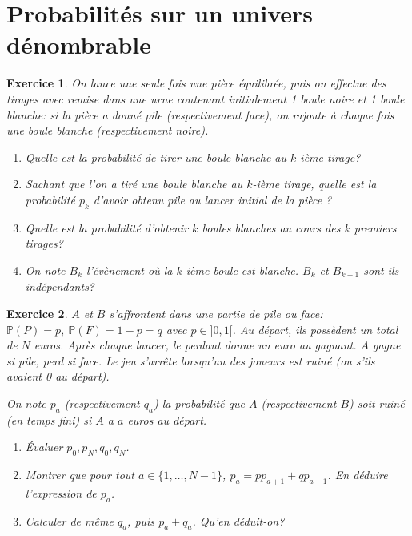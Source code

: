 \documentclass[12pt]{article}
\newtheorem{exercise}{Exercice}[section]
\theoremstyle{remark}
\theoremstyle{remark}
\renewcommand{\P}{\mathbb{P}} \newcommand{\im}{\emph{Im}}
\begin{document}
\cleardoublepage
\section{Probabilités sur un univers dénombrable}

\begin{exercise}
	On lance une seule fois une pièce équilibrée, puis on effectue des tirages
	avec remise dans une urne contenant initialement 1 boule noire et 1 boule
	blanche: si la pièce a donné pile (respectivement face), on rajoute à chaque
	fois une boule blanche (respectivement noire).
	\begin{enumerate}
		\item
		Quelle est la probabilité de tirer une boule blanche au $k$-ième tirage?
		\item
		Sachant que l'on a tiré une boule blanche au $k$-ième tirage, quelle est
		la probabilité $p_{k}$ d'avoir obtenu pile au lancer initial de la pièce ?
		\item
		Quelle est la probabilité d'obtenir $k$ boules blanches au cours des $k$
		premiers tirages?
		\item
		On note $B_{k}$ l'évènement où la $k$-ième boule est blanche. $B_{k}$ et
		$B_{k+1}$ sont-ils indépendants?
	\end{enumerate}
\end{exercise}

\begin{exercise}
	$A$ et $B$ s'affrontent dans une partie de pile ou face:
	$\P(P)=p,~\P(F)=1-p=q$ avec $p\in]0,1[$. Au départ, ils possèdent un total de
	$N$ euros. Après chaque lancer, le perdant donne un euro au gagnant. $A$ gagne
	si pile, perd si face. Le jeu s'arrête lorsqu'un des joueurs est ruiné (ou
	s'ils avaient 0 au départ).

	On note $p_{a}$ (respectivement $q_{a}$) la probabilité que $A$
	(respectivement $B$) soit ruiné (en temps fini) si $A$ a $a$ euros au départ.
	\begin{enumerate}
		\item
		Évaluer $p_{0},p_{N},q_{0},q_{N}$.
		\item
		Montrer que pour tout $a\in\{1,\dots,N-1\}$, $p_{a}=pp_{a+1}+qp_{a-1}$. En
		déduire l'expression de $p_{a}$.
		\item
		Calculer de même $q_{a}$, puis $p_{a}+q_{a}$. Qu'en déduit-on?
	\end{enumerate}
\end{exercise}
\end{document}
